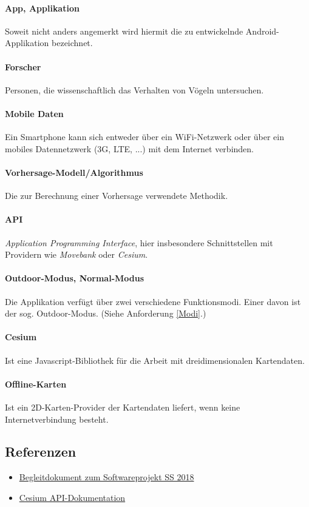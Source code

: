 \documentclass[12pt]{article} %
\begin{document}
\paragraph{App, Applikation} Soweit nicht anders angemerkt wird hiermit die zu entwickelnde Android-Applikation bezeichnet.
 \paragraph{Forscher} Personen, die wissenschaftlich das Verhalten von Vögeln untersuchen.
 \paragraph{Mobile Daten} Ein Smartphone kann sich entweder über ein WiFi-Netzwerk oder über ein mobiles Datennetzwerk (3G, LTE, ...) mit dem Internet verbinden. 
\paragraph{Vorhersage-Modell/Algorithmus} Die zur Berechnung einer Vorhersage verwendete Methodik. 
\paragraph{API} \textit{Application Programming Interface}, hier insbesondere Schnittstellen mit Providern wie \textit{Movebank} oder \textit{Cesium}. 
\paragraph{Outdoor-Modus, Normal-Modus} Die Applikation verfügt über zwei verschiedene Funktionsmodi. Einer davon ist der sog. Outdoor-Modus. (Siehe Anforderung \ref{Modi}.)
\paragraph{Cesium} Ist eine Javascript-Bibliothek für die Arbeit mit dreidimensionalen Kartendaten.
\paragraph{Offline-Karten} Ist ein 2D-Karten-Provider der Kartendaten liefert, wenn keine Internetverbindung besteht.

\subsection{Referenzen}

\begin{itemize} 
 	 \item  \href{https://docs.google.com/document/d/1Yc2f18JFaHyhrgM2h2WiATQ0zVmZnsc9W1ImhwWJF-g/edit?usp=sharing}{Begleitdokument zum Softwareprojekt SS 2018}
 	 \item \href{https://cesiumjs.org/refdoc/}{Cesium API-Dokumentation}
\end{itemize} 
\end{document}
